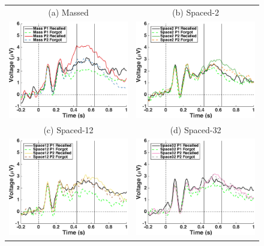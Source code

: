 \begin{figure}[hp]
  \centering
  \begin{tabular}{cc}
  \multicolumn{1}{c}{(a) Massed} & \multicolumn{1}{c}{(b) Spaced-2} \\
  \includegraphics[width=.35\textwidth]{./figs/exp2/tla_single_ga_word_rc_mass_p1_word_fo_mass_p1_word_rc_mass_p2_word_fo_mass_p2_E62_E72_E76_E77_E78_E84_E85_-200_1000_legend_xylabel} &
  \includegraphics[width=.35\textwidth]{./figs/exp2/tla_single_ga_word_rc_spac2_p1_word_fo_spac2_p1_word_rc_spac2_p2_word_fo_spac2_p2_E62_E72_E76_E77_E78_E84_E85_-200_1000_legend_xylabel} \\
  \multicolumn{1}{c}{(c) Spaced-12} & \multicolumn{1}{c}{(d) Spaced-32} \\
  \includegraphics[width=.35\textwidth]{./figs/exp2/tla_single_ga_word_rc_spac12_p1_word_fo_spac12_p1_word_rc_spac12_p2_word_fo_spac12_p2_E62_E72_E76_E77_E78_E84_E85_-200_1000_legend_xylabel} &
  \includegraphics[width=.35\textwidth]{./figs/exp2/tla_single_ga_word_rc_spac32_p1_word_fo_spac32_p1_word_rc_spac32_p2_word_fo_spac32_p2_E62_E72_E76_E77_E78_E84_E85_-200_1000_legend_xylabel} \\

\end{tabular}
\end{figure}
